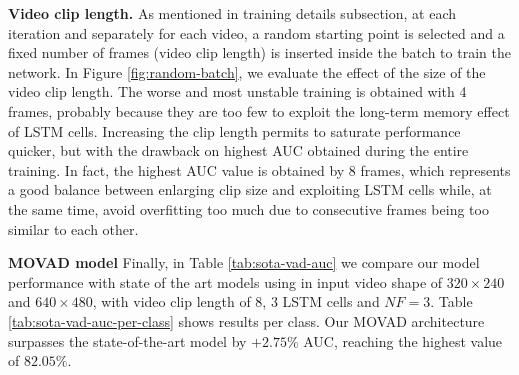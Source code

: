 
\noindent\textbf{Video clip length.}
As mentioned in training details subsection, at each iteration and separately for each video, a random starting point is selected and a fixed number of frames (video clip length) is inserted inside the batch to train the network.
In Figure \ref{fig:random-batch}, we evaluate the effect of the size of the video clip length.
The worse and most unstable training is obtained with 4 frames, probably because they are too few to exploit the long-term memory effect of LSTM cells.
Increasing the clip length permits to saturate performance quicker, but with the drawback on highest AUC obtained during the entire training.
In fact, the highest AUC value is obtained by 8 frames, which represents a good balance between enlarging clip size and exploiting LSTM cells while, at the same time, avoid overfitting too much due to consecutive frames being too similar to each other.

\noindent\textbf{MOVAD model}
Finally, in Table \ref{tab:sota-vad-auc} we compare our model performance with state of the art models using in input video shape of $320\times240$ and $640\times480$, with video clip length of 8, 3 LSTM cells and $NF=3$.
Table \ref{tab:sota-vad-auc-per-class} shows results per class.
Our MOVAD architecture surpasses the state-of-the-art model by $+2.75\%$ AUC, reaching the highest value of $82.05\%$.

